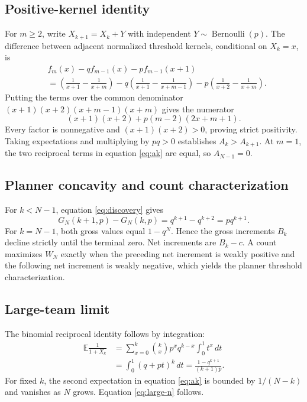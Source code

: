 \documentclass[11pt]{article}
\newcommand{\E}{\mathbb{E}}
\begin{document}
\subsection{Positive-kernel identity}

For $m\ge2$, write $X_{k+1}=X_k+Y$ with independent
$Y\sim\operatorname{Bernoulli}(p)$. The difference between adjacent normalized
threshold kernels, conditional on $X_k=x$, is
\begin{align*}
 &f_m(x)-qf_{m-1}(x)-pf_{m-1}(x+1)\\
 &=\left(\frac1{x+1}-\frac1{x+m}\right)
 -q\left(\frac1{x+1}-\frac1{x+m-1}\right)
 -p\left(\frac1{x+2}-\frac1{x+m}\right).
\end{align*}
Putting the terms over the common denominator
$(x+1)(x+2)(x+m-1)(x+m)$ gives the numerator
\[
 (x+1)(x+2)+p(m-2)(2x+m+1).
\]
Every factor is nonnegative and $(x+1)(x+2)>0$, proving strict positivity.
Taking expectations and multiplying by $pq>0$ establishes
$A_k>A_{k+1}$. At $m=1$, the two reciprocal terms in equation \eqref{eq:ak}
are equal, so $A_{N-1}=0$.

\subsection{Planner concavity and count characterization}

For $k<N-1$, equation \eqref{eq:discovery} gives
\[
 G_N(k+1,p)-G_N(k,p)=q^{k+1}-q^{k+2}=pq^{k+1}.
\]
For $k=N-1$, both gross values equal $1-q^N$. Hence the gross increments
$B_k$ decline strictly until the terminal zero. Net increments are $B_k-c$.
A count maximizes $W_N$ exactly when the preceding net increment is weakly
positive and the following net increment is weakly negative, which yields the
planner threshold characterization.

\subsection{Large-team limit}

The binomial reciprocal identity follows by integration:
\begin{align*}
 \E\frac{1}{1+X_k}
 &=\sum_{x=0}^k {k\choose x}p^xq^{k-x}\int_0^1 t^x\,dt\\
 &=\int_0^1(q+pt)^k\,dt
 =\frac{1-q^{k+1}}{(k+1)p}.
\end{align*}
For fixed $k$, the second expectation in equation \eqref{eq:ak} is bounded by
$1/(N-k)$ and vanishes as $N$ grows. Equation \eqref{eq:large-n} follows.
\end{document}
